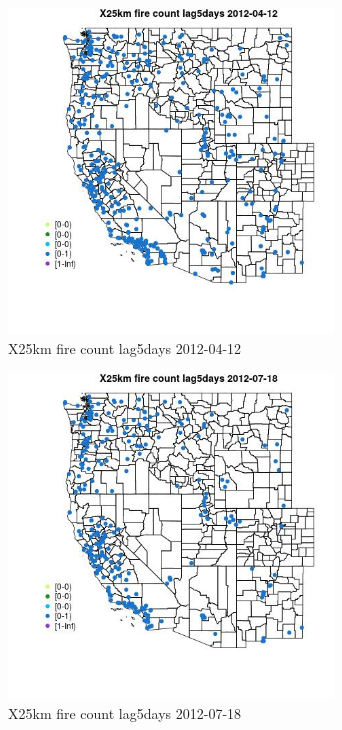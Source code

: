 \begin{figure} 
\centering  
\includegraphics[width=0.77\textwidth]{Code_Outputs/Report_ML_input_PM25_Step4_part_e_de_duplicated_aves_compiled_2019-05-14wNAs_MapObsX25km_fire_count_lag5days2012-04-12.jpg} 
\caption{\label{fig:Report_ML_input_PM25_Step4_part_e_de_duplicated_aves_compiled_2019-05-14wNAsMapObsX25km_fire_count_lag5days2012-04-12}X25km fire count lag5days 2012-04-12} 
\end{figure} 
 

\begin{figure} 
\centering  
\includegraphics[width=0.77\textwidth]{Code_Outputs/Report_ML_input_PM25_Step4_part_e_de_duplicated_aves_compiled_2019-05-14wNAs_MapObsX25km_fire_count_lag5days2012-07-18.jpg} 
\caption{\label{fig:Report_ML_input_PM25_Step4_part_e_de_duplicated_aves_compiled_2019-05-14wNAsMapObsX25km_fire_count_lag5days2012-07-18}X25km fire count lag5days 2012-07-18} 
\end{figure} 
 

